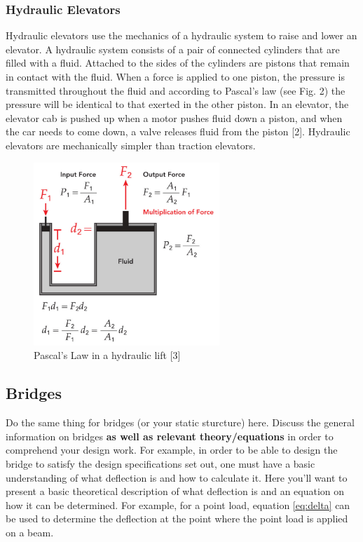 \documentclass[fleqn,12pt]{project}
\begin{document}
\subsubsection{Hydraulic Elevators}
Hydraulic elevators use the mechanics of a hydraulic system to raise and lower an elevator. A hydraulic system consists of a pair of connected cylinders that are filled with a fluid. Attached to the sides of the cylinders are pistons that remain in contact with the fluid. When a force is applied to one piston, the pressure is transmitted throughout the fluid and according to Pascal’s law (see Fig. 2) the pressure will be identical to that exerted in the other piston. In an elevator, the elevator cab is pushed up when a motor pushes fluid down a piston, and when the car needs to come down, a valve releases fluid from the piston [2]. Hydraulic elevators are mechanically simpler than traction elevators. 

\begin{figure}[h!]\centering
\includegraphics[width=7cm]{Pascals_Law.png}
\caption{Pascal's Law in a hydraulic lift [3]}
\label{fig:Fig1}
\end{figure}

\subsection{Bridges}

Do the same thing for bridges (or your static sturcture) here. Discuss the general information on bridges \textbf{as well as relevant theory/equations} in order to comprehend your design work. For example, in order to be able to design the bridge to satisfy the design specifications set out, one must have a basic understanding of what deflection is and how to calculate it. Here you'll want to present a basic theoretical description of what deflection is and an equation on how it can be determined. For example, for a point load, equation \ref{eq:delta}  can be used to determine the deflection at the point where the point load is applied on a beam. 
\end{document}
